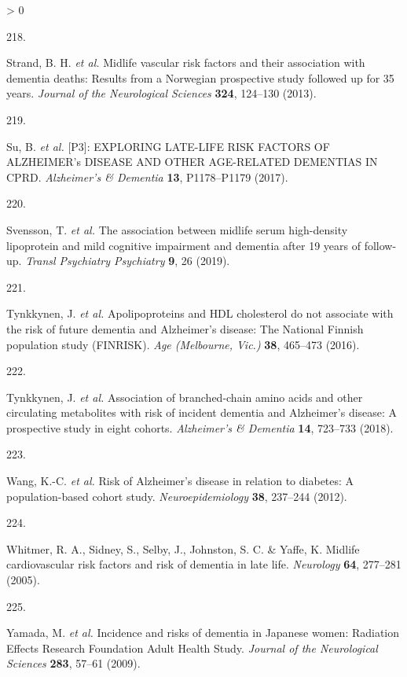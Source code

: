 \documentclass[a4paper, twoside]{templates/ociamthesis}
\newlength{\cslhangindent}
\newlength{\csllabelwidth}
\newenvironment{CSLReferences}[3] %
 {%
  \setlength{\parindent}{0pt}
  \ifodd #1 \everypar{\setlength{\hangindent}{\cslhangindent}}\ignorespaces\fi
  \ifnum #2 > 0
  \setlength{\parskip}{#2\baselineskip}
  \fi
 }%
 {}
\newcommand{\CSLLeftMargin}[1]{\parbox[t]{\maxof{\widthof{#1}}{\csllabelwidth}}{#1}}
\newcommand{\CSLRightInline}[1]{\parbox[t]{\linewidth - \csllabelwidth}{#1}}
\begin{document}
\begin{CSLReferences}{0}{0}
\leavevmode\hypertarget{ref-strand2013}{}%
\CSLLeftMargin{218. }
\CSLRightInline{Strand, B. H. \emph{et al.} Midlife vascular risk factors and their association with dementia deaths: Results from a {Norwegian} prospective study followed up for 35 years. \emph{Journal of the Neurological Sciences} \textbf{324}, 124--130 (2013).}

\leavevmode\hypertarget{ref-su2017}{}%
\CSLLeftMargin{219. }
\CSLRightInline{Su, B. \emph{et al.} {[}{P3}{}{]}: {EXPLORING LATE}-{LIFE RISK FACTORS OF ALZHEIMER}'s {DISEASE AND OTHER AGE}-{RELATED DEMENTIAS IN CPRD}. \emph{Alzheimer's \& Dementia} \textbf{13}, P1178--P1179 (2017).}

\leavevmode\hypertarget{ref-svensson2019}{}%
\CSLLeftMargin{220. }
\CSLRightInline{Svensson, T. \emph{et al.} The association between midlife serum high-density lipoprotein and mild cognitive impairment and dementia after 19 years of follow-up. \emph{Transl Psychiatry Psychiatry} \textbf{9}, 26 (2019).}

\leavevmode\hypertarget{ref-tynkkynen2016}{}%
\CSLLeftMargin{221. }
\CSLRightInline{Tynkkynen, J. \emph{et al.} Apolipoproteins and {HDL} cholesterol do not associate with the risk of future dementia and {Alzheimer}'s disease: The {National Finnish} population study ({FINRISK}). \emph{Age (Melbourne, Vic.)} \textbf{38}, 465--473 (2016).}

\leavevmode\hypertarget{ref-tynkkynen2018}{}%
\CSLLeftMargin{222. }
\CSLRightInline{Tynkkynen, J. \emph{et al.} Association of branched-chain amino acids and other circulating metabolites with risk of incident dementia and {Alzheimer}'s disease: A prospective study in eight cohorts. \emph{Alzheimer's \& Dementia} \textbf{14}, 723--733 (2018).}

\leavevmode\hypertarget{ref-wang2012}{}%
\CSLLeftMargin{223. }
\CSLRightInline{Wang, K.-C. \emph{et al.} Risk of {Alzheimer}'s disease in relation to diabetes: A population-based cohort study. \emph{Neuroepidemiology} \textbf{38}, 237--244 (2012).}

\leavevmode\hypertarget{ref-whitmer2005a}{}%
\CSLLeftMargin{224. }
\CSLRightInline{Whitmer, R. A., Sidney, S., Selby, J., Johnston, S. C. \& Yaffe, K. Midlife cardiovascular risk factors and risk of dementia in late life. \emph{Neurology} \textbf{64}, 277--281 (2005).}

\leavevmode\hypertarget{ref-yamada2009b}{}%
\CSLLeftMargin{225. }
\CSLRightInline{Yamada, M. \emph{et al.} Incidence and risks of dementia in {Japanese} women: Radiation {Effects Research Foundation Adult Health Study}. \emph{Journal of the Neurological Sciences} \textbf{283}, 57--61 (2009).}


\end{CSLReferences}
\end{document}
